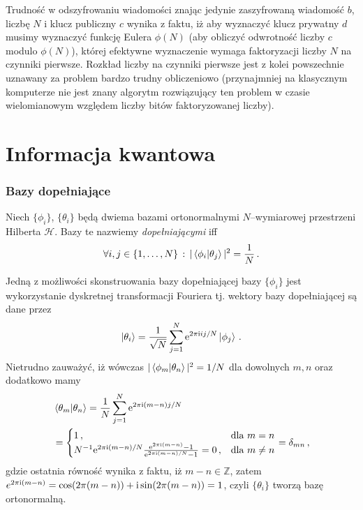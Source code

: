 \documentclass{myclass}
\begin{document}
Trudność w odszyfrowaniu wiadomości znając jedynie zaszyfrowaną wiadomość \(b\), liczbę \(N\) i
klucz publiczny \(c\) wynika z faktu, iż aby wyznaczyć klucz prywatny \(d\) musimy wyznaczyć funkcję
Eulera \(\phi(N)\) (aby obliczyć odwrotność liczby \(c\) modulo \(\phi(N)\)), której efektywne
wyznaczenie wymaga faktoryzacji liczby \(N\) na czynniki pierwsze. Rozkład liczby na czynniki
pierwsze jest z kolei powszechnie uznawany za problem bardzo trudny obliczeniowo (przynajmniej na
klasycznym komputerze nie jest znany algorytm rozwiązujący ten problem w czasie wielomianowym
względem liczby bitów faktoryzowanej liczby).


\section{Informacja kwantowa}

\subsubsection*{Bazy dopełniające}
\begin{definition}
    Niech \(\{\phi_i\}\), \(\{\theta_i\}\)  będą dwiema bazami ortonormalnymi \(N\)--wymiarowej
    przestrzeni Hilberta \(\mathscr{H}\). Bazy te nazwiemy \textit{dopełniającymi} iff
    \begin{equation*}
        \forall i,j\in\{1,\ldots,N\}\,:\, |\braket{\phi_i}{\theta_j}|^2 = \frac{1}{N}\,.
    \end{equation*}
\end{definition}
Jedną z możliwości skonstruowania bazy dopełniającej bazy \(\{\phi_i\}\) jest wykorzystanie
dyskretnej transformacji Fouriera tj. wektory bazy dopełniającej są dane przez
\begin{equation*}
    \ket{\theta_i} = \frac{1}{\sqrt{N}}\sum_{j=1}^N \mathrm{e}^{2\pi\mathrm{i} ij/N}\ket{\phi_j}\,.
\end{equation*}
Nietrudno zauważyć, iż wówczas \(|\braket{\phi_m}{\theta_n}|^2 = 1/N\) dla dowolnych \(m, n\) oraz
dodatkowo mamy
\begin{equation*}
    \begin{split}
        &\braket{\theta_m}{\theta_n} = \frac{1}{N}\sum_{j=1}^N \mathrm{e}^{2\pi\mathrm{i}(m - n)j/N} \\
        &= \begin{cases}
            1\,,&\text{dla \(m=n\)}\\
            N^{-1}\mathrm{e}^{2\pi\mathrm{i}(m-n)/N}\frac{\mathrm{e}^{2\pi\mathrm{i}(m-n)} - 1}{\mathrm{e}^{2\pi\mathrm{i}(m-n)/N} - 1} = 0\,,&\text{dla \(m\neq n\)}
        \end{cases} = \delta_{mn}\,,
    \end{split}
\end{equation*}
gdzie ostatnia równość wynika z faktu, iż \(m-n\in\mathbb{Z}\), zatem \(e^{2\pi\mathrm{i}(m-n)} =
\cos(2\pi(m-n)) + \mathrm{i}\sin(2\pi(m-n)) = 1\), czyli \(\{\theta_i\}\) tworzą bazę ortonormalną.
\end{document}
